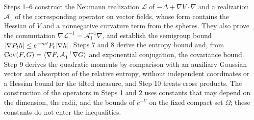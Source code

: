 Steps 1--6 construct the Neumann realization $\mathcal L$ of $-\Delta+\nabla V\cdot\nabla$ and a realization $\mathcal A_1$ of the corresponding operator on vector fields, whose form contains the Hessian of $V$ and a nonnegative curvature term from the spheres. They also prove the commutation $\nabla\mathcal L^{-1}=\mathcal A_1^{-1}\nabla$, and establish the semigroup bound $\lvert \nabla P_th\rvert\le e^{-mt}P_t\lvert \nabla h\rvert$. Steps 7 and 8 derive the entropy bound and, from $\operatorname{Cov}(F,G)=\langle \nabla F,\mathcal A_1^{-1}\nabla G\rangle$ and exponential conjugation, the covariance bound. Step 9 derives the quadratic moments by comparison with an auxiliary Gaussian vector and absorption of the relative entropy, without independent coordinates or a Hessian bound for the tilted measure, and Step 10 treats cross products. The construction of the operators in Steps 1 and 2 uses constants that may depend on the dimension, the radii, and the bounds of $e^{-V}$ on the fixed compact set $\Omega$; these constants do not enter the inequalities.

